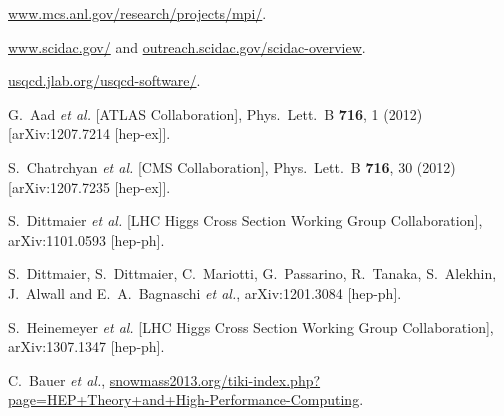 \begin{thebibliography}{99}
\url{www.mcs.anl.gov/research/projects/mpi/}.

\url{www.scidac.gov/} and \url{outreach.scidac.gov/scidac-overview}.
  
\url{usqcd.jlab.org/usqcd-software/}.

  G.~Aad {\it et al.}  [ATLAS Collaboration],
  Phys.\ Lett.\ B {\bf 716}, 1 (2012)
  [arXiv:1207.7214 [hep-ex]].

  S.~Chatrchyan {\it et al.}  [CMS Collaboration],
  Phys.\ Lett.\ B {\bf 716}, 30 (2012)
  [arXiv:1207.7235 [hep-ex]].

  S.~Dittmaier {\it et al.}  [LHC Higgs Cross Section Working Group Collaboration],
  arXiv:1101.0593 [hep-ph].

  S.~Dittmaier, S.~Dittmaier, C.~Mariotti, G.~Passarino, R.~Tanaka, S.~Alekhin, J.~Alwall and E.~A.~Bagnaschi {\it et al.},
  arXiv:1201.3084 [hep-ph].

  S.~Heinemeyer {\it et al.}  [LHC Higgs Cross Section Working Group Collaboration],
  arXiv:1307.1347 [hep-ph].

C.~Bauer {\it et al.},
\url{snowmass2013.org/tiki-index.php?page=HEP+Theory+and+High-Performance-Computing}.


\end{thebibliography}
